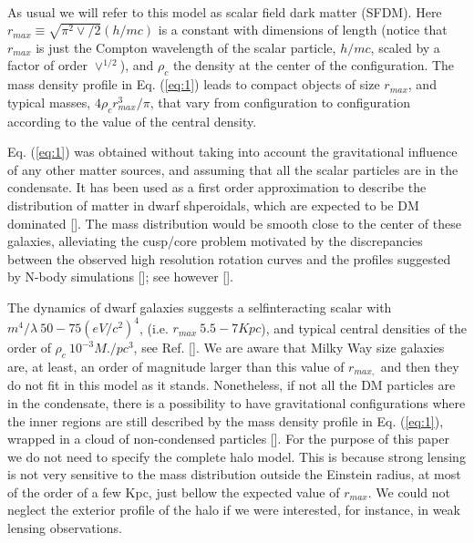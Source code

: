 \documentclass{article}
\begin{document}
\begin{multicols}{2}
\begin{equation}
\begin{split}
\end{split}
\end{equation}
As usual we will refer to this model as scalar field dark
matter (SFDM). Here $r_{max} \equiv \sqrt{\pi^2\vee /2} (h/mc)$ is a constant
with dimensions of length (notice that $r_{max}$ is just
the Compton wavelength of the scalar particle, $h/mc$,
scaled by a factor of order $\vee^{1/2}$), and $\rho_c$ the density at
the center of the configuration. The mass density profile
in Eq. (\ref{eq:1}) leads to compact objects of size $r_{max}$, and typical
masses, $4\rho_cr^3_{max}/\pi$, that vary from configuration to
configuration according to the value of the central density.\par
Eq. (\ref{eq:1}) was obtained without taking into account the
gravitational influence of any other matter sources, and
assuming that all the scalar particles are in the condensate.
It has been used as a first order approximation to
describe the distribution of matter in dwarf shperoidals,
which are expected to be DM dominated [\cite{6, 7, 8}]. The mass
distribution would be smooth close to the center of these
galaxies, alleviating the cusp/core problem motivated by
the discrepancies between the observed high resolution
rotation curves and the profiles suggested by N-body simulations
[\cite{9}]; see however [\cite{10}].\par
The dynamics of dwarf galaxies suggests a selfinteracting
scalar with $m^4/\lambda ~ 50 - 75 (eV/c^2)^4$, (i.e.
$r_{max} ~ 5.5 - 7 Kpc$), and typical central densities of the
order of $\rho_c~10^{-3}M./pc^3$, see Ref. [\cite{6}]. We are aware
that Milky Way size galaxies are, at least, an order of
magnitude larger than this value of $r_{max,}$ and then they
do not fit in this model as it stands. Nonetheless, if
not all the DM particles are in the condensate, there is
a possibility to have gravitational configurations where
the inner regions are still described by the mass density
profile in Eq. (\ref{eq:1}), wrapped in a cloud of non-condensed
particles [\cite{11}]. For the purpose of this paper we do not
need to specify the complete halo model. This is because
strong lensing is not very sensitive to the mass distribution
outside the Einstein radius, at most of the order of
a few Kpc, just bellow the expected value of $r_{max}$. We
could not neglect the exterior profile of the halo if we were
interested, for instance, in weak lensing observations.


\end{multicols}
\end{document}
